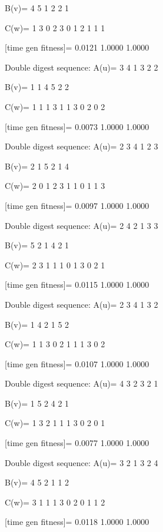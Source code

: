 B(v)=
     4     5     1     2     2     1

C(w)=
     1     3     0     2     3     0     1     2     1     1     1

[time gen fitness]=
    0.0121    1.0000    1.0000

Double digest sequence:
A(u)=
     3     4     1     3     2     2

B(v)=
     1     1     4     5     2     2

C(w)=
     1     1     1     3     1     1     3     0     2     0     2

[time gen fitness]=
    0.0073    1.0000    1.0000

Double digest sequence:
A(u)=
     2     3     4     1     2     3

B(v)=
     2     1     5     2     1     4

C(w)=
     2     0     1     2     3     1     1     0     1     1     3

[time gen fitness]=
    0.0097    1.0000    1.0000

Double digest sequence:
A(u)=
     2     4     2     1     3     3

B(v)=
     5     2     1     4     2     1

C(w)=
     2     3     1     1     1     0     1     3     0     2     1

[time gen fitness]=
    0.0115    1.0000    1.0000

Double digest sequence:
A(u)=
     2     3     4     1     3     2

B(v)=
     1     4     2     1     5     2

C(w)=
     1     1     3     0     2     1     1     1     3     0     2

[time gen fitness]=
    0.0107    1.0000    1.0000

Double digest sequence:
A(u)=
     4     3     2     3     2     1

B(v)=
     1     5     2     4     2     1

C(w)=
     1     3     2     1     1     1     3     0     2     0     1

[time gen fitness]=
    0.0077    1.0000    1.0000

Double digest sequence:
A(u)=
     3     2     1     3     2     4

B(v)=
     4     5     2     1     1     2

C(w)=
     3     1     1     1     3     0     2     0     1     1     2

[time gen fitness]=
    0.0118    1.0000    1.0000

